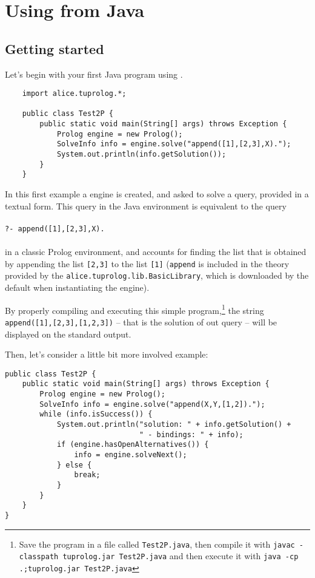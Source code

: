 \chapter{Using \tuprolog{} from Java}
\label{java-api}

\section{Getting started}

Let's begin with your first Java program using \tuprolog{}.
%
{\small{
\begin{verbatim}
    import alice.tuprolog.*;

    public class Test2P {
        public static void main(String[] args) throws Exception {
            Prolog engine = new Prolog();
            SolveInfo info = engine.solve("append([1],[2,3],X).");
            System.out.println(info.getSolution());
        }
    }
\end{verbatim}
}}
\noindent In this first example a \tuprolog{} engine is
created, and asked to solve a query, provided in a textual form.
%
This query in the Java environment is equivalent to the query\\\\
%
{\small{\texttt{?- append([1],[2,3],X).\\\\}}}
%
\noindent in a classic Prolog environment, and accounts for
finding the list that is obtained by appending the list
\texttt{[2,3]} to the list \texttt{[1]} (\texttt{append} is
included in the theory provided by the
\texttt{alice.tuprolog.lib.BasicLibrary}, which is downloaded by
the default when instantiating the engine).
%

By properly compiling and executing this simple program,\footnote{Save the program in a file called \texttt{Test2P.java}, then compile it with
%
\texttt{javac -classpath tuprolog.jar Test2P.java}
%
and then execute it with
%
\texttt{java -cp .;tuprolog.jar Test2P.java}} the string
\texttt{append([1],[2,3],[1,2,3])} -- that is the solution of out
query -- will be displayed on the standard output.
%
%

\noindent Then, let's consider a little bit more involved example:

{\small{
\begin{verbatim}
public class Test2P {
    public static void main(String[] args) throws Exception {
        Prolog engine = new Prolog();
        SolveInfo info = engine.solve("append(X,Y,[1,2]).");
        while (info.isSuccess()) {
            System.out.println("solution: " + info.getSolution() +
                               " - bindings: " + info);
            if (engine.hasOpenAlternatives()) {
                info = engine.solveNext();
            } else {
                break;
            }
        }
    }
}
\end{verbatim}
}}


